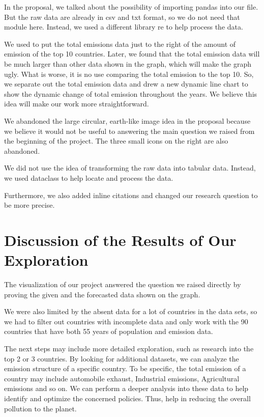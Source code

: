 \documentclass[fontsize=11pt]{article}
\begin{document}
In the proposal, we talked about the possibility of importing pandas into our file. But the raw data are already in csv and txt format, so we do not need that module here. Instead, we used a different library re to help process the data.

We used to put the total emissions data just to the right of the amount of emission of the top 10 countries. Later, we found that the total emission data will be much larger than other data shown in the graph, which will make the graph ugly. What is worse, it is no use comparing the total emission to the top 10. So, we separate out the total emission data and drew a new dynamic line chart to show the dynamic change of total emission throughout the years. We believe this idea will make our work more straightforward.


We abandoned the large circular, earth-like image idea in the proposal because we believe it would not be useful to answering the main question we raised from the beginning of the project.
The three small icons on the right are also abandoned.

We did not use the idea of transforming the raw data into tabular data. Instead, we used dataclass to help locate and process the data.

Furthermore, we also added inline citations and changed our research question to be more precise.

\section*{Discussion of the Results of Our Exploration} \indent

The visualization of our project answered the question we raised directly by proving the given and the forecasted data shown on the graph.

We were also limited by the absent data for a lot of countries in the data sets, so we had to filter out countries with incomplete data and only work with the 90 countries that have both 55 years of population and emission data.

The next steps may include more detailed exploration, such as research into the top 2 or 3 countries. By looking for additional datasets, we can analyze the emission structure of a specific country. To be specific, the total emission of a country may include automobile exhaust, Industrial emissions, Agricultural emissions and so on. We can perform a deeper analysis into these data to help identify and optimize the concerned policies. Thus, help in reducing the overall pollution to the planet.
\end{document}
